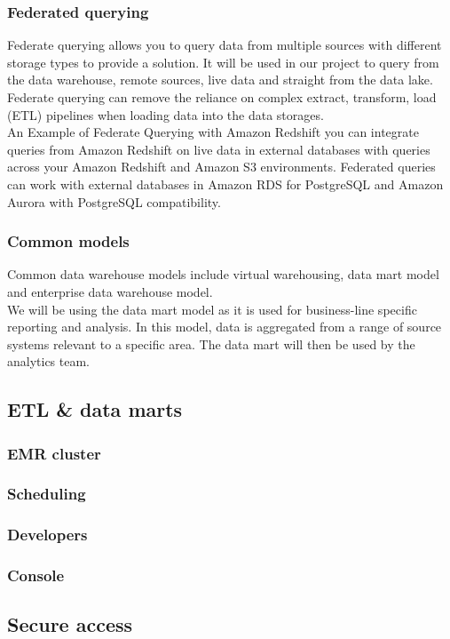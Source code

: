 \documentclass[10pt]{article}
\begin{document}
\subsubsection{Federated querying}
Federate querying allows you to query data from multiple sources with different storage types to provide a solution. It will be used in our project to query from the data warehouse, remote sources, live data and straight from the data lake. Federate querying can remove the reliance on complex extract, transform, load (ETL) pipelines when loading data into the data storages.
\\
An Example of Federate Querying with Amazon Redshift \cite{federate-queries} you can integrate queries from Amazon Redshift on live data in external databases with queries across your Amazon Redshift and Amazon S3 environments. Federated queries can work with external databases in Amazon RDS for PostgreSQL and Amazon Aurora with PostgreSQL compatibility.
\subsubsection{Common models}
Common data warehouse models \cite{data-modelling} include virtual warehousing, data mart model and enterprise data warehouse model.
\\
We will be using the data mart model as it is used for business-line specific reporting and analysis. In this model, data is aggregated from a range of source systems relevant to a specific area. The data mart will then be used by the analytics team.
\subsection{ETL \& data marts}
\subsubsection{EMR cluster}
\subsubsection{Scheduling}
\subsubsection{Developers}
\subsubsection{Console}

\subsection{Secure access}
\label{sec:secure_access}
\end{document}
